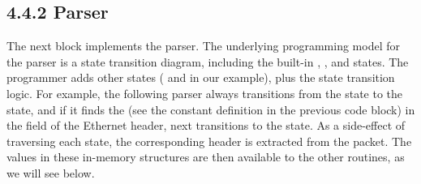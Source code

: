 \documentclass[letterpaper,11pt,english]{sphinxmanual}
\begin{document}
\subsection{4.4.2 Parser}
\label{\detokenize{switch:parser}}
The next block implements the parser. The underlying programming model
for the parser is a state transition diagram, including the built-in
, , and  states. The programmer adds
other states ( and  in our example),
plus the state transition logic. For example, the following parser
always transitions from the  state to the 
state, and if it finds the  (see the constant definition
in the previous code block) in the  field of the Ethernet
header, next transitions to the  state. As a side-effect
of traversing each state, the corresponding header is extracted from
the packet. The values in these in-memory structures are then
available to the other routines, as we will see below.

\begin{sphinxVerbatim}[commandchars=\\\{\}]

 
                 
                  
                  
                   

      
         

      
          
             
             

      
         
\end{sphinxVerbatim}
\end{document}
